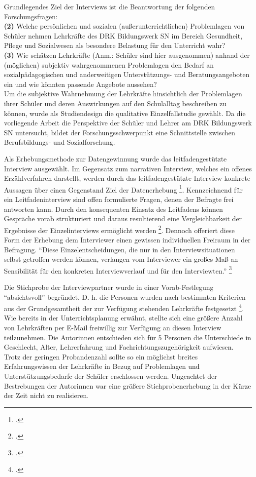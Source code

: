 \noindent
Grundlegendes Ziel der Interviews ist die Beantwortung der folgenden Forschungsfragen:\\

\noindent
\textbf{(2)} Welche persönlichen und sozialen (außerunterrichtlichen) Problemlagen von Schüler nehmen Lehrkräfte des DRK Bildungswerk SN im Bereich Gesundheit, Pflege und Sozialwesen als besondere Belastung für den Unterricht wahr?\\

\noindent
\textbf{(3)} Wie schätzen Lehrkräfte (Anm.: Schüler sind hier ausgenommen) anhand der (möglichen) subjektiv wahrgenommenen Problemlagen den Bedarf an sozialpädagogischen und anderweitigen Unterstützungs- und Beratungsangeboten ein und wie könnten passende Angebote aussehen?\\

\noindent
Um die subjektive Wahrnehmung der Lehrkräfte hinsichtlich der Problemlagen ihrer Schüler und deren Auswirkungen auf den Schulalltag beschreiben zu können, wurde als Studiendesign die qualitative Einzelfallstudie gewählt. Da die vorliegende Arbeit die Perspektive der Schüler und Lehrer am DRK Bildungswerk SN untersucht, bildet der Forschungsschwerpunkt eine Schnittstelle zwischen Berufsbildungs- und Sozialforschung.

Als Erhebungsmethode zur Datengewinnung wurde das leitfadengestützte Interview ausgewählt. Im Gegensatz zum narrativen Interview, welches ein offenes Erzählverfahren darstellt, werden durch das leitfadengestützte Interview konkrete Aussagen über einen Gegenstand Ziel der Datenerhebung \footcite[vgl.][37]{Mayer2013}. Kennzeichnend für ein Leitfadeninterview sind offen formulierte Fragen, denen der Befragte frei antworten kann. Durch den konsequenten Einsatz des Leitfadens können Gespräche vorab strukturiert und daraus resultierend eine Vergleichbarkeit der Ergebnisse der Einzelinterviews ermöglicht werden \footcites[vgl.][112]{Flick1999}[vgl.][376f]{Friebertshaeuser1997}. Dennoch offeriert diese Form der Erhebung dem Interviewer einen gewissen individuellen  Freiraum in der Befragung. "`Diese Einzelentscheidungen, die nur in den Interviewsituationen selbst getroffen werden können, verlangen vom Interviewer ein großes Maß an Sensibilität für den konkreten Interviewverlauf und für den Interviewten."' \footcite[113]{Flick1999} 

Die Stichprobe der Interviewpartner wurde in einer Vorab-Festlegung "`absichtsvoll"' begründet. D. h. die Personen wurden nach bestimmten Kriterien aus der Grundgesamtheit der zur Verfügung stehenden Lehrkräfte festgesetzt \footcite[vgl.][39]{Mayer2013}. Wie bereits in der Unterrichtsplanung erwähnt, stellte sich eine größere Anzahl von Lehrkräften per E-Mail freiwillig zur Verfügung an diesen Interview teilzunehmen. Die Autorinnen entschieden sich für 5 Personen die Unterschiede in Geschlecht, Alter, Lehrerfahrung und Fachrichtungszugehörigkeit aufwiesen. Trotz der geringen Probandenzahl sollte so ein möglichst breites Erfahrungswissen der Lehrkräfte in Bezug auf Problemlagen und Unterstützungsbedarfe der Schüler erschlossen werden. Ungeachtet der Bestrebungen der Autorinnen war eine größere Stichprobenerhebung in der Kürze der Zeit nicht zu realisieren.

